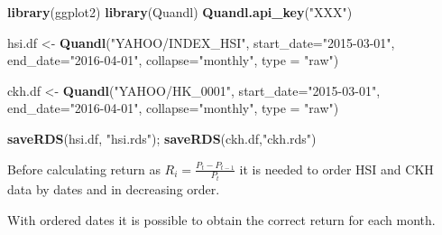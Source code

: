 \documentclass[]{article}
\newenvironment{Shaded}{\begin{snugshade}}{\end{snugshade}}
\newcommand{\KeywordTok}[1]{\textcolor[rgb]{0.13,0.29,0.53}{\textbf{{#1}}}}
\newcommand{\DataTypeTok}[1]{\textcolor[rgb]{0.13,0.29,0.53}{{#1}}}
\newcommand{\DecValTok}[1]{\textcolor[rgb]{0.00,0.00,0.81}{{#1}}}
\newcommand{\StringTok}[1]{\textcolor[rgb]{0.31,0.60,0.02}{{#1}}}
\newcommand{\NormalTok}[1]{{#1}}
\begin{document}
\begin{Shaded}
\begin{Highlighting}[]
\KeywordTok{library}\NormalTok{(ggplot2)}
\KeywordTok{library}\NormalTok{(Quandl)}
\KeywordTok{Quandl.api_key}\NormalTok{(}\StringTok{"XXX"}\NormalTok{)}

\NormalTok{hsi.df <-}\StringTok{ }\KeywordTok{Quandl}\NormalTok{(}\StringTok{"YAHOO/INDEX_HSI"}\NormalTok{, }\DataTypeTok{start_date=}\StringTok{"2015-03-01"}\NormalTok{, }\DataTypeTok{end_date=}\StringTok{"2016-04-01"}\NormalTok{,}
                 \DataTypeTok{collapse=}\StringTok{"monthly"}\NormalTok{, }\DataTypeTok{type =} \StringTok{"raw"}\NormalTok{)}

\NormalTok{ckh.df <-}\StringTok{ }\KeywordTok{Quandl}\NormalTok{(}\StringTok{"YAHOO/HK_0001"}\NormalTok{, }\DataTypeTok{start_date=}\StringTok{"2015-03-01"}\NormalTok{, }
                 \DataTypeTok{end_date=}\StringTok{"2016-04-01"}\NormalTok{, }\DataTypeTok{collapse=}\StringTok{"monthly"}\NormalTok{, }\DataTypeTok{type =} \StringTok{"raw"}\NormalTok{)}

\KeywordTok{saveRDS}\NormalTok{(hsi.df, }\StringTok{"hsi.rds"}\NormalTok{); }\KeywordTok{saveRDS}\NormalTok{(ckh.df,}\StringTok{"ckh.rds"}\NormalTok{)}
\end{Highlighting}
\end{Shaded}

Before calculating return as
\(R_i = \displaystyle \frac{P_t - P_{t-1}}{P_t}\) it is needed to order
HSI and CKH data by dates and in decreasing order.

\begin{Shaded}
\end{Shaded}

With ordered dates it is possible to obtain the correct return for each
month.
\end{document}

